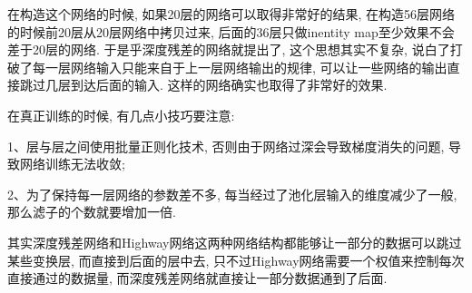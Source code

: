 在构造这个网络的时候, 如果20层的网络可以取得非常好的结果, 在构造56层网络的时候前20层从20层网络中拷贝过来, 后面的36层只做inentity map至少效果不会差于20层的网络.
于是乎深度残差的网络就提出了, 这个思想其实不复杂, 说白了打破了每一层网络输入只能来自于上一层网络输出的规律, 可以让一些网络的输出直接跳过几层到达后面的输入.
这样的网络确实也取得了非常好的效果.
\begin{remark}
在真正训练的时候, 有几点小技巧要注意:

1、层与层之间使用批量正则化技术, 否则由于网络过深会导致梯度消失的问题, 导致网络训练无法收敛;

2、为了保持每一层网络的参数差不多, 每当经过了池化层输入的维度减少了一般, 那么滤子的个数就要增加一倍.

其实深度残差网络和Highway网络这两种网络结构都能够让一部分的数据可以跳过某些变换层, 而直接到后面的层中去, 只不过Highway网络需要一个权值来控制每次直接通过的数据量, 而深度残差网络就直接让一部分数据通到了后面.
\end{remark}
